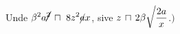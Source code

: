 %
Unde $\rule[-4mm]{0mm}{10mm} \displaystyle \beta ^2 a \cancel{^2} \, \sqcap \ 8z^2\cancel{a}x$, sive $\protect\rule[-4mm]{0mm}{10mm} \displaystyle z \, \sqcap \, 2 \beta \sqrt{\protect\vphantom{\frac{2a}{x}}}\frac{2a}{x}$.$\Bigr)$%
